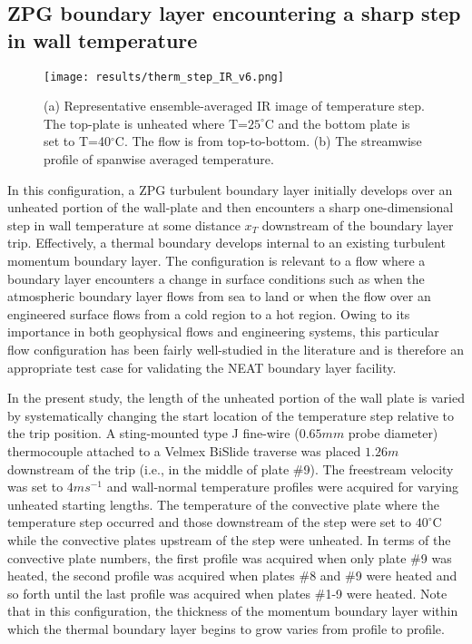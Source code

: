 \subsection{ZPG boundary layer encountering a sharp step in wall temperature}
\begin{figure*}[h!]
\centering
\texttt{[image: results/therm\_step\_IR\_v6.png]}
\caption{(a) Representative ensemble-averaged IR image of temperature step. The top-plate is unheated where T=$25^\circ$C and the bottom plate is set to T=40$^\circ$C. The flow is from top-to-bottom. (b) The streamwise profile of spanwise averaged temperature.} 
\label{fig:IR-STEP}
\end{figure*}

In this configuration, a ZPG turbulent boundary layer initially develops over an unheated portion of the wall-plate and then encounters a sharp one-dimensional step in wall temperature at some distance $x_T$ downstream of the boundary layer trip. 
Effectively, a thermal boundary develops internal to an existing turbulent momentum boundary layer. 
The configuration is relevant to a flow where a boundary layer encounters a change in surface conditions such as when the atmospheric boundary layer flows from sea to land or when the flow over an engineered surface flows from a cold region to a hot region.  
Owing to its importance in both geophysical flows and engineering systems, this particular flow configuration has been fairly well-studied in the literature \cite{Antonia1977,Hoffmann1979, Moretti1965} and is therefore an appropriate test case for validating the NEAT boundary layer facility. 

In the present study, the length of the unheated portion of the wall plate is varied by systematically changing the start location of the temperature step relative to the trip position. 
A sting-mounted type J fine-wire ($0.65mm$ probe diameter) thermocouple attached to a Velmex BiSlide traverse was placed $1.26m$ downstream of the trip (i.e., in the middle of plate $\#$9). 
The freestream velocity was set to $4ms^{-1}$ and wall-normal temperature profiles were acquired for varying unheated starting lengths. 
The temperature of the convective plate where the temperature step occurred and those downstream of the step were set to $40^\circ$C while the convective plates upstream of the step were unheated. 
In terms of the convective plate numbers, the first profile was acquired when only plate \#9 was heated, the second profile was acquired when plates \#8 and \#9 were heated and so forth until the last profile was acquired when plates \#1-9 were heated.  
Note that in this configuration, the thickness of the momentum boundary layer within which the thermal boundary layer begins to grow varies from profile to profile. 

